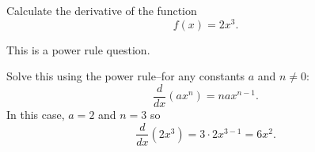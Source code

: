 \documentclass{ximera}
\author{Emma Smith Zbarsky}
\begin{document}
\begin{exercise}

Calculate the derivative of the function \[f(x) = 2x^3.\]


\begin{hint}
This is a power rule question.
\end{hint}


\begin{hint}
Solve this using the power rule--for any constants $a$ and $n \neq 0$:
\[\frac{d}{dx}\left(ax^n\right) = nax^{n-1}.\] In this case, $a=2$ and
$n=3$ so
\[\frac{d}{dx}\left(2x^3\right) = 3\cdot 2 x^{3-1} = \boxed{6x^2}.\]
\end{hint}


\begin{multipleChoice}
\end{multipleChoice}

\end{exercise}
\end{document}
